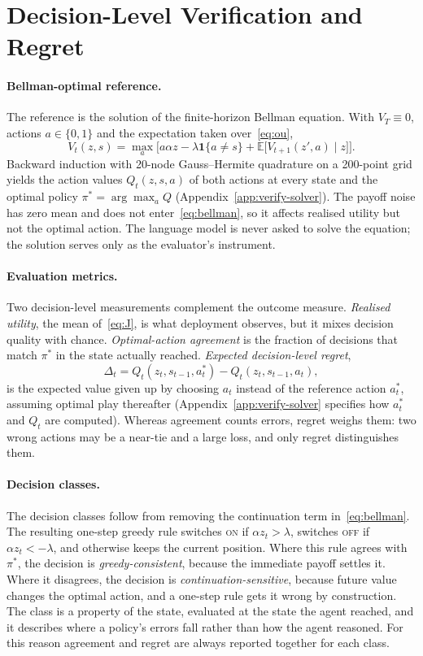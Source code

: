 \documentclass[10pt,a4paper,twocolumn]{article}
\newcommand{\ON}{\textsc{on}}
\newcommand{\OFF}{\textsc{off}}
\begin{document}
\section{Decision-Level Verification and Regret}\label{sec:method}

\paragraph{Bellman-optimal reference.} The reference is the solution of the finite-horizon Bellman equation. With $V_T\equiv0$, actions $a\in\{0,1\}$ and the expectation taken over~\eqref{eq:ou},
\begin{equation}
V_t(z,s)=\max_{a}\Big[a\alpha z-\lambda\mathbf 1\{a\neq s\}+\mathbb E\big[V_{t+1}(z',a)\mid z\big]\Big].
\label{eq:bellman}
\end{equation}
Backward induction with 20-node Gauss--Hermite quadrature on a 200-point grid yields the action values $Q_t(z,s,a)$ of both actions at every state and the optimal policy $\pi^*=\arg\max_a Q$ (Appendix~\ref{app:verify-solver}). The payoff noise has zero mean and does not enter~\eqref{eq:bellman}, so it affects realised utility but not the optimal action. The language model is never asked to solve the equation; the solution serves only as the evaluator's instrument.

\paragraph{Evaluation metrics.} Two decision-level measurements complement the outcome measure. \emph{Realised utility}, the mean of~\eqref{eq:J}, is what deployment observes, but it mixes decision quality with chance. \emph{Optimal-action agreement} is the fraction of decisions that match $\pi^*$ in the state actually reached. \emph{Expected decision-level regret},
\[
\Delta_t=Q_t(z_t,s_{t-1},a^*_t)-Q_t(z_t,s_{t-1},a_t),
\]
is the expected value given up by choosing $a_t$ instead of the reference action $a^*_t$, assuming optimal play thereafter (Appendix~\ref{app:verify-solver} specifies how $a^*_t$ and $Q_t$ are computed). Whereas agreement counts errors, regret weighs them: two wrong actions may be a near-tie and a large loss, and only regret distinguishes them.

\paragraph{Decision classes.}\label{sec:classes} The decision classes follow from removing the continuation term in~\eqref{eq:bellman}. The resulting one-step greedy rule switches \ON{} if $\alpha z_t>\lambda$, switches \OFF{} if $\alpha z_t<-\lambda$, and otherwise keeps the current position. Where this rule agrees with $\pi^*$, the decision is \emph{greedy-consistent}, because the immediate payoff settles it. Where it disagrees, the decision is \emph{continuation-sensitive}, because future value changes the optimal action, and a one-step rule gets it wrong by construction. The class is a property of the state, evaluated at the state the agent reached, and it describes where a policy's errors fall rather than how the agent reasoned. For this reason agreement and regret are always reported together for each class.
\end{document}

